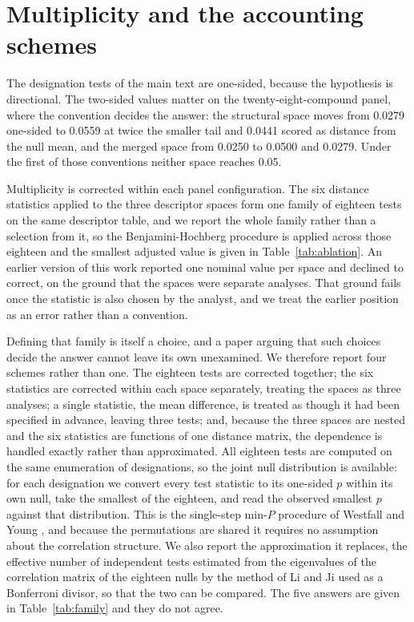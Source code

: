 \documentclass[journal=jacsat,manuscript=suppinfo,margin=1in]{achemso}
\begin{document}
\section{Multiplicity and the accounting schemes}

The designation tests of the main text are one-sided, because the hypothesis
is directional. The two-sided values matter on the twenty-eight-compound panel,
where the convention decides the answer: the structural space moves from 0.0279
one-sided to 0.0559 at twice the smaller tail and 0.0441 scored as distance
from the null mean, and the merged space from 0.0250 to 0.0500 and 0.0279.
Under the first of those conventions neither space reaches 0.05.

\label{meth:multiplicity}
Multiplicity is corrected within each panel configuration. The six distance
statistics applied to the three descriptor spaces form one family of eighteen
tests on the same descriptor table, and we report the whole family rather than a
selection from it, so the Benjamini-Hochberg procedure \cite{benjamini1995} is
applied across those eighteen and the smallest adjusted value is given in
Table~\ref{tab:ablation}. An earlier version of this work reported one nominal
value per space and declined to correct, on the ground that the spaces were
separate analyses. That ground fails once the statistic is also chosen by the
analyst, and we treat the earlier position as an error rather than a convention.

Defining that family is itself a choice, and a paper arguing that such choices
decide the answer cannot leave its own unexamined. We therefore report four
schemes rather than one. The eighteen tests are corrected together; the six
statistics are corrected within each space separately, treating the spaces as
three analyses; a single statistic, the mean difference, is treated as though it
had been specified in advance, leaving three tests; and, because the three
spaces are nested and the six statistics are functions of one distance matrix,
the dependence is handled exactly rather than approximated. All eighteen tests
are computed on the same enumeration of designations, so the joint null
distribution is available: for each designation we convert every test statistic
to its one-sided $p$ within its own null, take the smallest of the eighteen, and
read the observed smallest $p$ against that distribution. This is the
single-step min-$P$ procedure of Westfall and Young \cite{westfall1993}, and
because the permutations are shared it requires no assumption about the
correlation structure. We also report the approximation it replaces, the
effective number of independent tests estimated from the eigenvalues of the
correlation matrix of the eighteen nulls by the method of Li and Ji
\cite{liji2005} used as a Bonferroni divisor, so that the two can be compared.
The five answers are given in Table~\ref{tab:family} and they do not agree.
\end{document}

